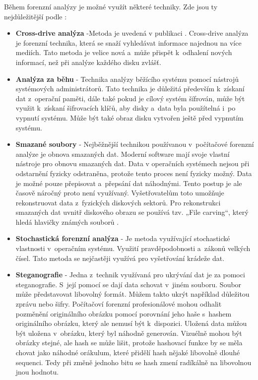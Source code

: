 \documentclass[thesis=B,czech]{FITthesis}[2012/06/26]
\begin{document}
Během forenzní analýzy je možné využít některé techniky. Zde jsou ty nejdůležitější podle \cite{for_w}:
\begin{itemize}
\item \textbf{Cross-drive analýza} -Metoda je uvedená v publikaci \cite{garfinkel2006forensic}. Cross-drive analýza je forenzní technika, která se snaží vyhledávat informace najednou na více mediích. Tato metoda je velice nová a~může přispět k~odhalení nových informací, než při analýze každého disku zvlášť.

\item \textbf{Analýza za běhu} - Technika analýzy běžícího systému pomocí nástrojů systémových administrátorů. Tato technika je důležitá především k~získaní dat z~operační paměti, dále také pokud je cílový systém šífrován, může být využit k~získaní šifrovacích klíčů, aby disky a~data byla použítelná i~po vypnutí systému. Může být také obraz disku vytvořen ještě před vypnutím systému.

\item \textbf{Smazané soubory} - Nejběžnější technikou používanou v~počítačové forenzní analýze je obnova smazaných dat. Moderní software mají svoje vlastní nástroje pro obnovu smazaných dat. Data v operačních systémech nejsou při odstarnění fyzicky odstraněna, protože tento proces není fyzicky možný. Data je možné pouze přepisovat a~přepsání dat náhodnými. Tento postup je ale časově náročný proto není využívaný. Vyšetřovatelům toto umožňuje rekonstruovat data z~fyzických diskových sektorů. Pro rekonstrukci smazaných dat uvnitř diskového obrazu se používá tzv. „File carving“, který hledá hlavičky známých souborů \cite{for_w}. 

\item \textbf{Stochastická forenzní analýza} - Je metoda využívající stochastické vlastnosti v~operačním systému. Využití pravděpodobnosti a~zákonů velkých čísel. Tato metoda se nejčastěji využívá pro vyšetřování krádeže dat.

\item \textbf{Steganografie} - Jedna z~technik využívaná pro ukrývání dat je za pomoci steganografie. S~její pomocí se dají data schovat v~jiném souboru. Soubor může představovat libovolný formát. Můžem takto ukrýt například důležitou zprávu nebo šifry. Počítačoví forenzní profesionálové mohou odhalit pozměnění originálního obrázku pomocí porovnání jeho haše s~hashem originálního obrázku, který ale nemusí být k~dispozici. Uložená data můžou být uložena v~obrázku, který byl náhodně generován. Vizuélně mohou být obrázky stejné, ale hash se může lišit, protože hashovací funkce by se měla chovat jako náhodné orákulum, které přidělí hash nějaké libovolně dlouhé sequenci. Tedy při změně jednoho bitu se hash zmení radíkálně na libovolnou jnou hodnotu.


\end{itemize}
\end{document}

